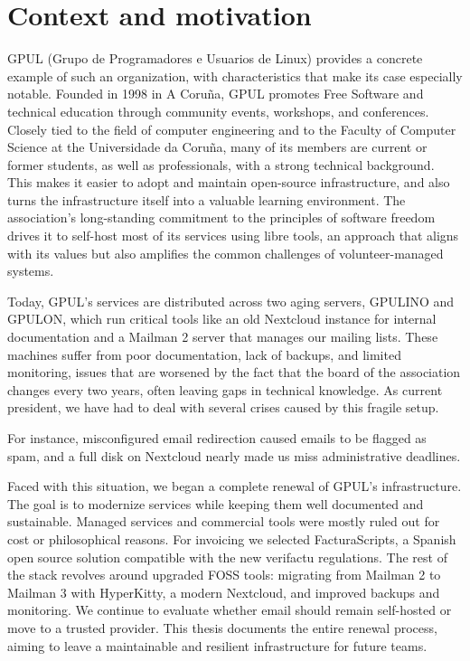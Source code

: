 \section{Context and motivation}

GPUL (Grupo de Programadores e Usuarios de Linux) \cite{gpul-web} provides a concrete example of such an organization, with characteristics that make its case especially notable. Founded in 1998 in A Coruña, GPUL promotes Free Software and technical education through community events, workshops, and conferences. Closely tied to the field of computer engineering and to the Faculty of Computer Science at the Universidade da Coruña, many of its members are current or former students, as well as professionals, with a strong technical background. This makes it easier to adopt and maintain open-source infrastructure, and also turns the infrastructure itself into a valuable learning environment. The association's long-standing commitment to the principles of software freedom drives it to self-host most of its services using libre tools, an approach that aligns with its values but also amplifies the common challenges of volunteer-managed systems.

Today, GPUL's services are distributed across two aging servers, GPULINO and GPULON, which run critical tools like an old Nextcloud instance for internal documentation and a Mailman 2 server that manages our mailing lists. These machines suffer from poor documentation, lack of backups, and limited monitoring, issues that are worsened by the fact that the board of the association changes every two years, often leaving gaps in technical knowledge. As current president, we have had to deal with several crises caused by this fragile setup.

For instance, misconfigured email redirection caused emails to be flagged as spam, and a full disk on Nextcloud nearly made us miss administrative deadlines.

Faced with this situation, we began a complete renewal of GPUL's infrastructure. The goal is to modernize services while keeping them well documented and sustainable. Managed services and commercial tools were mostly ruled out for cost or philosophical reasons. For invoicing we selected FacturaScripts\cite{facturascripts-antifraude}, a Spanish open source solution compatible with the new \gls{verifactu} regulations\cite{boe-a-2024-22138}. The rest of the stack revolves around upgraded FOSS tools: migrating from Mailman 2 to Mailman 3 with HyperKitty\cite{hyperkitty-web}, a modern Nextcloud, and improved backups and monitoring. We continue to evaluate whether email should remain self-hosted or move to a trusted provider. This thesis documents the entire renewal process, aiming to leave a maintainable and resilient infrastructure for future teams.

